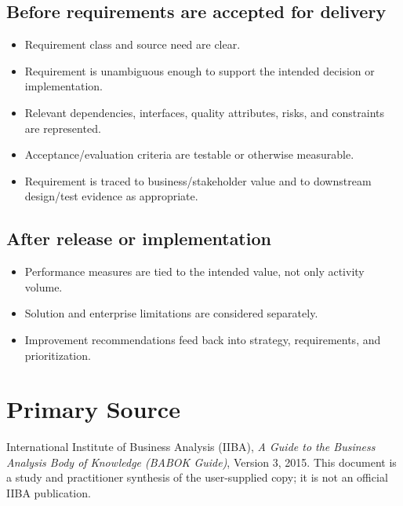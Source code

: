 \documentclass[11pt]{article}
\begin{document}
\subsection{Before requirements are accepted for delivery}
\begin{itemize}
\item Requirement class and source need are clear.
\item Requirement is unambiguous enough to support the intended decision or implementation.
\item Relevant dependencies, interfaces, quality attributes, risks, and constraints are represented.
\item Acceptance/evaluation criteria are testable or otherwise measurable.
\item Requirement is traced to business/stakeholder value and to downstream design/test evidence as appropriate.
\end{itemize}
\subsection{After release or implementation}
\begin{itemize}
\item Performance measures are tied to the intended value, not only activity volume.
\item Solution and enterprise limitations are considered separately.
\item Improvement recommendations feed back into strategy, requirements, and prioritization.
\end{itemize}

\section*{Primary Source}
International Institute of Business Analysis (IIBA), \emph{A Guide to the Business Analysis Body of Knowledge (BABOK Guide)}, Version 3, 2015. This document is a study and practitioner synthesis of the user-supplied copy; it is not an official IIBA publication.
\end{document}
